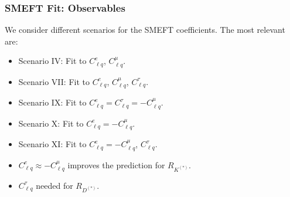 \documentclass[mathserif, 10pt]{beamer}
\begin{document}
\begin{frame}\frametitle{SMEFT Fit: Observables}

    We consider different scenarios for the SMEFT coefficients. The most relevant are:
    {\scriptsize \begin{itemize}
        \item Scenario IV: Fit to $C_{\ell q}^e$, $C_{\ell q}^\mu$.
        \item Scenario VII: Fit to $C_{\ell q}^e$, $C_{\ell q}^\mu$, $C_{\ell q}^\tau$.
        \item Scenario IX: Fit to $C_{\ell q}^e = C_{\ell q}^\tau = - C_{\ell q}^\mu$.
        \item Scenario X: Fit to $C_{\ell q}^e =  - C_{\ell q}^\mu$.
        \item Scenario XI: Fit to $C_{\ell q}^e = - C_{\ell q}^\mu$, $C_{\ell q}^\tau$.
    \end{itemize}}

    \begin{figure}\begin{center}
            \resizebox{0.52\textwidth}{!}{}
            \resizebox{0.37\textwidth}{!}{}

        \end{center}
    \end{figure}
    \begin{itemize}
        \item $C_{\ell q}^e \approx - C_{\ell q}^\mu$ improves the prediction for $R_{K^{(*)}}$.
        \item $C_{\ell q}^\tau$ needed for $R_{D^{(*)}}$.
    \end{itemize}

\end{frame}
\end{document}
